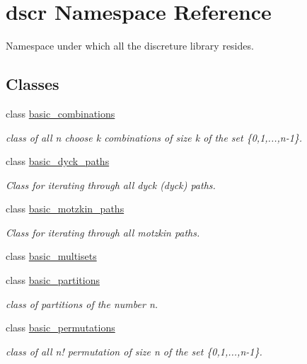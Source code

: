 \hypertarget{namespacedscr}{\section{dscr Namespace Reference}
\label{namespacedscr}
}


Namespace under which all the discreture library resides.  


\subsection*{Classes}
\begin{DoxyCompactItemize}
\item 
class \hyperlink{classdscr_1_1basic__combinations}{basic\-\_\-combinations}
\begin{DoxyCompactList}\small\item\em class of all n choose k combinations of size k of the set \{0,1,...,n-\/1\}. \end{DoxyCompactList}\item 
class \hyperlink{classdscr_1_1basic__dyck__paths}{basic\-\_\-dyck\-\_\-paths}
\begin{DoxyCompactList}\small\item\em Class for iterating through all dyck (dyck) paths. \end{DoxyCompactList}\item 
class \hyperlink{classdscr_1_1basic__motzkin__paths}{basic\-\_\-motzkin\-\_\-paths}
\begin{DoxyCompactList}\small\item\em Class for iterating through all motzkin paths. \end{DoxyCompactList}\item 
class \hyperlink{classdscr_1_1basic__multisets}{basic\-\_\-multisets}
\item 
class \hyperlink{classdscr_1_1basic__partitions}{basic\-\_\-partitions}
\begin{DoxyCompactList}\small\item\em class of partitions of the number n. \end{DoxyCompactList}\item 
class \hyperlink{classdscr_1_1basic__permutations}{basic\-\_\-permutations}
\begin{DoxyCompactList}\small\item\em class of all n! permutation of size n of the set \{0,1,...,n-\/1\}. \end{DoxyCompactList}\item 

\end{DoxyCompactItemize}
